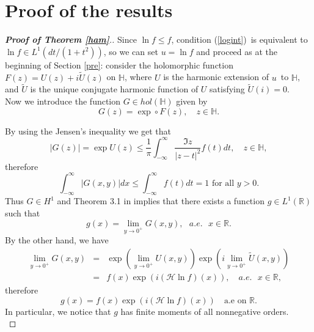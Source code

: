 \documentclass{amsart}
\newcommand{\R}{\mathbb{R}}
\newcommand{\U}{\mathbb{H}}
\newcommand{\INT}{\int_{-\infty}^{\infty}}
\begin{document}
\section{Proof of the results}
\begin{proof}[\textbf{Proof of Theorem \ref{ham}}.]
Since $\ln f\leq f$, condition (\ref{logint})\ is equivalent to $\ln f\in L^{1}(
dt/( 1+t^{2}))$, so we can set $u=\ln f$ and proceed as at the beginning of Section \ref{pre}: consider the holomorphic function $F(z)=U(z)+i\widetilde{U}(z)$ on $\U$, where $U$ is the harmonic
extension of $u$\ to $\U$, and $\widetilde{U}$ is the unique conjugate harmonic function of $U$ satisfying $\widetilde{U}(i)=0.$\\

Now we introduce the function $G\in hol(\U)$ given by
\begin{equation*}
G\left( z\right) =\exp \circ F (z),\quad z\in \U. %
\end{equation*}

By using the Jensen's inequality we get that 
\begin{equation*}
\left| G\left( z\right) \right| =\exp U\left( z\right) \leq \frac{1}{\pi } \INT \frac{\Im z}{|z-t|^2} f\left( t\right) dt, \quad z\in\U,
\end{equation*}
therefore 
\begin{equation*}
\INT\left| G\left( x,y\right) \right| dx\leq \INT f\left( t\right) dt=1\text{ for all }y>0.
\end{equation*}
Thus $G \in H^{1}$ and Theorem 3.1 in \cite[page 55]{Garnett}  implies that there exists a function $g\in L^{1}( \R) $ such that 
\begin{equation*}
g( x) =\lim_{y\rightarrow 0^+}G\left( x,y\right) ,\text{\ }a.e.\text{ }x\in \R .
\end{equation*}
By the other hand, we have
\begin{eqnarray*}
\lim_{y\rightarrow 0^+} G\left( x,y\right) &=&\exp\left(\lim_{y\rightarrow 0^+}U(x,y)\right) \exp\left(i\lim_{y\rightarrow 0^+}\widetilde{U}(x,y)\right)\\
                                                              & =& f\left( x\right) \exp\left(i(\mathcal{H}\ln f )(x)\right),\quad a.e.\text{ }x\in \mathbb{R},
\end{eqnarray*}
therefore 
\begin{equation} \label{fuente}
g(x)=f\left( x\right) \exp\left(i(\mathcal{H}\ln f )(x)\right) \quad \text{a.e on } \R.
\end{equation}
In particular, we notice that $g$ has finite moments of all nonnegative orders.\\


\end{proof}
\end{document}
